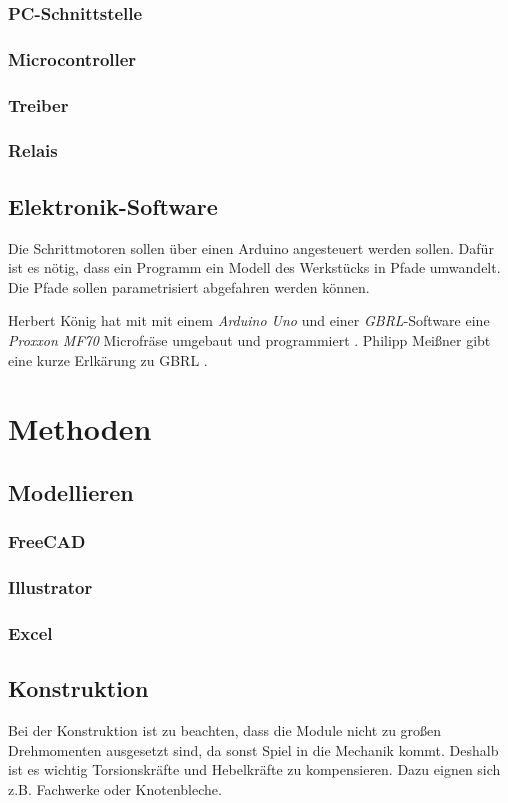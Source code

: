 \documentclass[
	a4paper,
	smallheadings,
	german,
	]
	{scrreprt}
\begin{document}
	\subsection{PC-Schnittstelle}
	\subsection{Microcontroller}
	\subsection{Treiber}
	\subsection{Relais}
\section{Elektronik-Software}
Die Schrittmotoren sollen über einen Arduino angesteuert werden sollen.
Dafür ist es nötig, dass ein Programm ein Modell des Werkstücks in Pfade umwandelt.
Die Pfade sollen parametrisiert abgefahren werden können.

Herbert König hat mit mit einem \textit{Arduino Uno} und einer \textit{GBRL}-Software eine \textit{Proxxon MF70} Microfräse umgebaut und programmiert \autocite{:Herbert}. Philipp Meißner gibt eine kurze Erlkärung zu GBRL \autocite{:Meissner}.

\chapter{Methoden}

\section{Modellieren}
	\subsection{FreeCAD}
	\subsection{Illustrator}
	\subsection{Excel}
\section{Konstruktion}
Bei der Konstruktion ist zu beachten, dass die Module nicht zu großen Drehmomenten ausgesetzt sind, da sonst Spiel in die Mechanik kommt.
Deshalb ist es wichtig Torsionskräfte und Hebelkräfte zu kompensieren.
Dazu eignen sich z.B. Fachwerke oder Knotenbleche.
\end{document}
